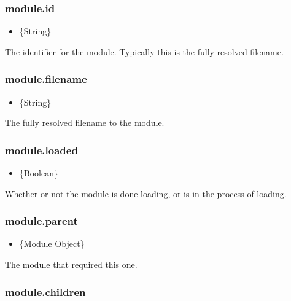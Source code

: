 \subsubsection{module.id}\label{module.id}

\begin{itemize}
\itemsep1pt\parskip0pt
\item
  \{String\}
\end{itemize}

The identifier for the module. Typically this is the fully resolved
filename.

\subsubsection{module.filename}\label{module.filename}

\begin{itemize}
\itemsep1pt\parskip0pt
\item
  \{String\}
\end{itemize}

The fully resolved filename to the module.

\subsubsection{module.loaded}\label{module.loaded}

\begin{itemize}
\itemsep1pt\parskip0pt
\item
  \{Boolean\}
\end{itemize}

Whether or not the module is done loading, or is in the process of
loading.

\subsubsection{module.parent}\label{module.parent}

\begin{itemize}
\itemsep1pt\parskip0pt
\item
  \{Module Object\}
\end{itemize}

The module that required this one.

\subsubsection{module.children}\label{module.children}

